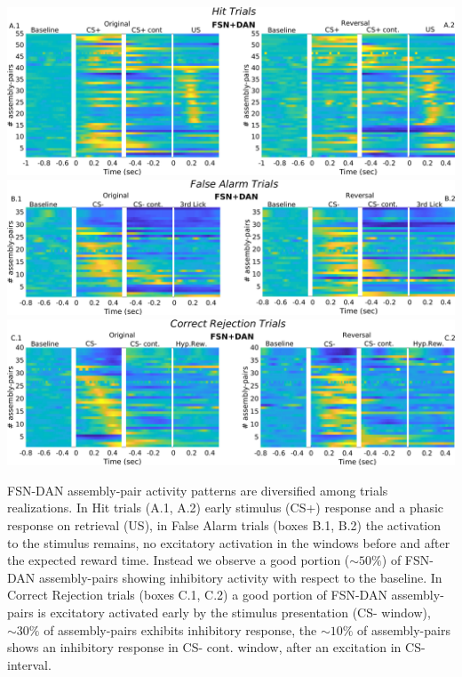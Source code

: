  \begin{largefigure}[20pt]
 \centering
 \includegraphics[scale=0.3]{figures/HeatFSN_DANHit.png} \includegraphics[scale=0.3]{figures/HeatFA_FSN_DAN1.png}
 \includegraphics[scale=0.3]{figures/HeatCR_FSN_DAN1.png}
  \caption{FSN-DAN assembly-pair activity patterns are diversified among trials realizations. In Hit trials (A.1, A.2) early stimulus (CS+) response and a phasic response on retrieval (US), in False Alarm trials (boxes B.1, B.2) the activation to the stimulus remains, no excitatory activation in the windows before and after the expected reward time. Instead we observe a good portion ($\sim50\%$) of FSN-DAN assembly-pairs showing inhibitory activity with respect to the baseline. In Correct Rejection trials (boxes C.1, C.2) a good portion of FSN-DAN assembly-pairs is excitatory activated early by the stimulus presentation (CS- window), $\sim30\%$ of assembly-pairs exhibits inhibitory response, the $\sim10\%$ of assembly-pairs shows an inhibitory response in CS- cont. window, after an excitation in CS- interval.}
  \label{fig:HeatFSN_DANComp}
\end{largefigure}
\pagebreak


